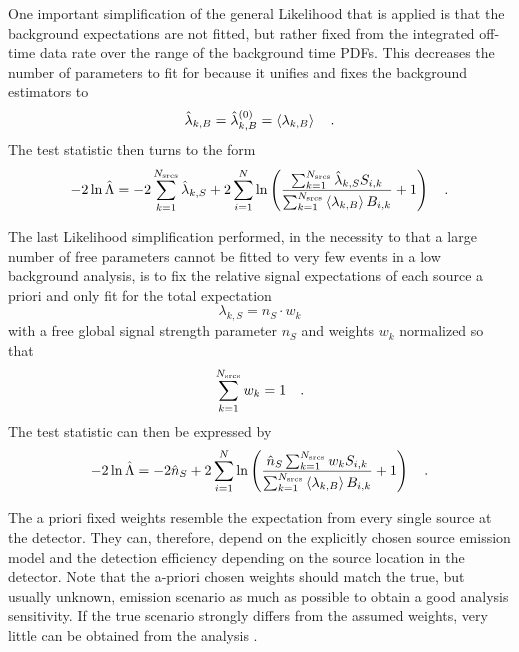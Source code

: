One important simplification of the general Likelihood that is applied is that the background expectations are not fitted, but rather fixed from the integrated off-time data rate over the range of the background time PDFs.
This decreases the number of parameters to fit for because it unifies and fixes the background estimators to
\begin{equation}
  \hat{\lambda}_{k,B} = \hat{\lambda}_{k,B}^{(0)} = \Braket{\lambda_{k,B}}
  \quad\text{.}
\end{equation}
The test statistic then turns to the form
\begin{equation}
  -2\ln\hat{\Lambda}
  = -2\sum_{k=1}^{N_\text{srcs}}\hat{\lambda}_{k,S} +
      2\sum_{i=1}^N \ln\left(
        \frac{\sum_{k=1}^{N_\text{srcs}}\hat{\lambda}_{k,S} S_{i,k}}
             {\sum_{k=1}^{N_\text{srcs}}\Braket{\lambda_{k,B}} B_{i,k}}
        + 1
      \right)
  \quad\text{.}
\end{equation}

The last Likelihood simplification performed, in the necessity to that a large number of free parameters cannot be fitted to very few events in a low background analysis, is to fix the relative signal expectations of each source a priori and only fit for the total expectation
\begin{equation}
  \lambda_{k,S} = n_S \cdot w_k
\end{equation}
with a free global signal strength parameter $n_S$ and weights $w_k$ normalized so that
\begin{equation}
  \sum_{k=1}^{N_\text{srcs}} w_k = 1
  \quad\text{.}
\end{equation}
The test statistic can then be expressed by
\begin{equation}
  -2\ln\hat{\Lambda}
  = -2\hat{n}_S +
      2\sum_{i=1}^N \ln\left(
        \frac{\hat{n}_S \sum_{k=1}^{N_\text{srcs}} w_k S_{i,k}}
             {\sum_{k=1}^{N_\text{srcs}}\Braket{\lambda_{k,B}} B_{i,k}}
        + 1
      \right)
  \quad\text{.}
\end{equation}

The a priori fixed weights resemble the expectation from every single source at the detector.
They can, therefore, depend on the explicitly chosen source emission model and the detection efficiency depending on the source location in the detector.
Note that the a-priori chosen weights should match the true, but usually unknown, emission scenario as much as possible to obtain a good analysis sensitivity.
If the true scenario strongly differs from the assumed weights, very little can be obtained from the analysis .


